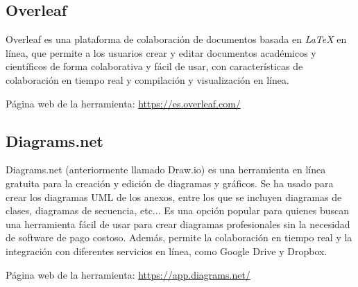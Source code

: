 \subsection{Overleaf}
 Overleaf es una plataforma de colaboración de documentos basada en \textit{\LaTeX} en línea, que permite a los usuarios crear y editar documentos académicos y científicos de forma colaborativa y fácil de usar, con características de colaboración en tiempo real y compilación y visualización en línea.\cite{wiki:overleaf}
 
Página web de la herramienta: \url{https://es.overleaf.com/}

\subsection{Diagrams.net}
Diagrams.net (anteriormente llamado Draw.io) es una herramienta en línea gratuita para la creación y edición de diagramas y gráficos. Se ha usado para crear los diagramas UML de los anexos, entre los que se incluyen diagramas de clases, diagramas de secuencia, etc... Es una opción popular para quienes buscan una herramienta fácil de usar para crear diagramas profesionales sin la necesidad de software de pago costoso. Además, permite la colaboración en tiempo real y la integración con diferentes servicios en línea, como Google Drive y Dropbox. \cite{wiki:diagrams}

Página web de la herramienta: \url{https://app.diagrams.net/}



















